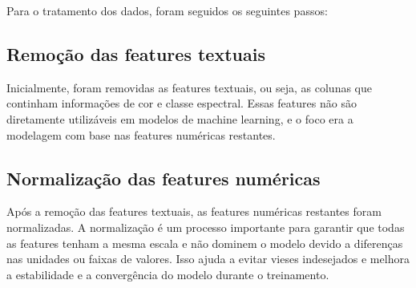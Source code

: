 \documentclass[11pt]{article}
\theoremstyle{definition}
\begin{document}
Para o tratamento dos dados, foram seguidos os seguintes passos:

\subsection{Remoção das features textuais}
Inicialmente, foram removidas as features textuais, ou seja, as colunas que continham informações de cor e classe espectral. Essas features não são diretamente utilizáveis em modelos de machine learning, e o foco era a modelagem com base nas features numéricas restantes.

\subsection{Normalização das features numéricas}
Após a remoção das features textuais, as features numéricas restantes foram normalizadas. A normalização é um processo importante para garantir que todas as features tenham a mesma escala e não dominem o modelo devido a diferenças nas unidades ou faixas de valores. Isso ajuda a evitar vieses indesejados e melhora a estabilidade e a convergência do modelo durante o treinamento.
\end{document}
